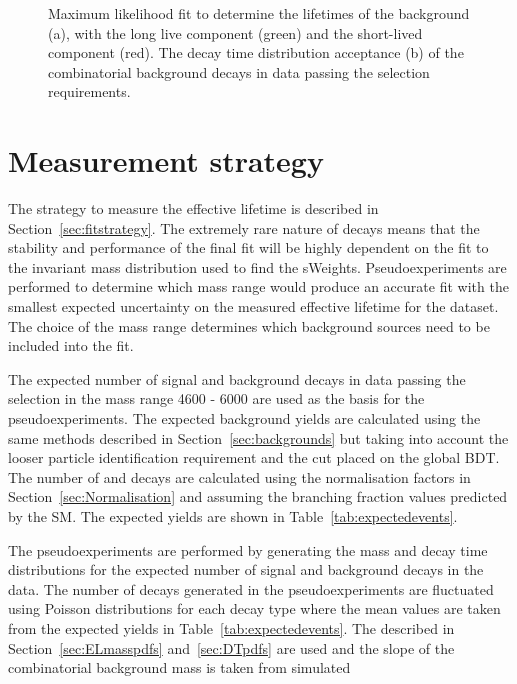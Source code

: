 {\begin{figure}[tbp]
\begin{subfigure}[b]{0.48\textwidth}
   \end{subfigure}
    \caption{Maximum likelihood fit to determine the lifetimes of the background (a), with the long live component (green) and the short-lived component (red). The decay time distribution acceptance (b) of the combinatorial background decays in data passing the \bhh selection requirements.}
    \label{fig:CBGaccpt}
\end{figure}



\section{Measurement strategy}%
\label{sec:toys}
The strategy to measure the \bsmumu effective lifetime is described in Section~\ref{sec:fitstrategy}. The extremely rare nature of \bsmumu decays means that the stability and performance of the final fit will be highly dependent on the fit to the invariant mass distribution used to find the sWeights. Pseudoexperiments are performed to determine which mass range would produce an accurate fit with the smallest expected uncertainty on the measured effective lifetime for the dataset. The choice of the mass range determines which background sources need to be included into the fit.


The expected number of signal and background decays in data passing the \bsmumu selection in the mass range 4600 - 6000 \mevcc are used as the basis for the pseudoexperiments. The expected background yields are calculated using the same methods described in Section~\ref{sec:backgrounds} but taking into account the looser particle identification requirement and the cut placed on the global BDT. The number of \bsmumu and \bdmumu decays are calculated using the normalisation factors in Section~\ref{sec:Normalisation} and assuming the branching fraction values predicted by the SM. The expected yields are shown in Table~\ref{tab:expectedevents}. 



The pseudoexperiments are performed by generating the mass and decay time distributions for the expected number of signal and background decays in the data. The number of decays generated in the pseudoexperiments are fluctuated using Poisson distributions for each decay type where the mean values are taken from the expected yields in Table~\ref{tab:expectedevents}. The \pdfs described in Section~\ref{sec:ELmasspdfs} and~\ref{sec:DTpdfs} are used and the slope of the combinatorial background mass \pdf is taken from simulated 


}
